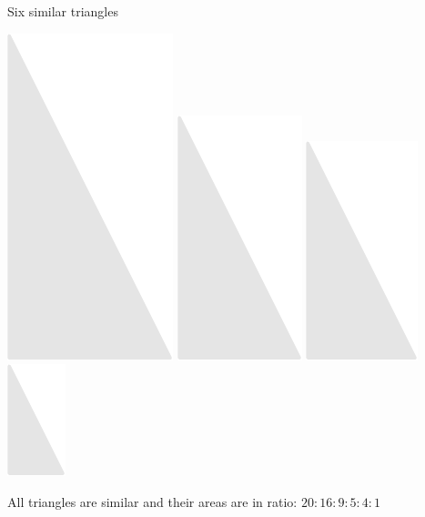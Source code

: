 \documentclass[14pt]{beamer}
\begin{document}
\begin{frame}{Six similar triangles}
\begin{center}
            \includegraphics[scale=0.35]{figures/figure024d.pdf}\quad
            \includegraphics[scale=0.35]{figures/figure024c.pdf}\quad
            \includegraphics[scale=0.35]{figures/figure024b.pdf}\quad
            \includegraphics[scale=0.35]{figures/figure024a.pdf}\\

            \bigskip\bigskip

            {\footnotesize All triangles are similar and their areas are in ratio: $20:16:9:5:4:1$}
        \end{center}
    \end{frame}
\end{document}

